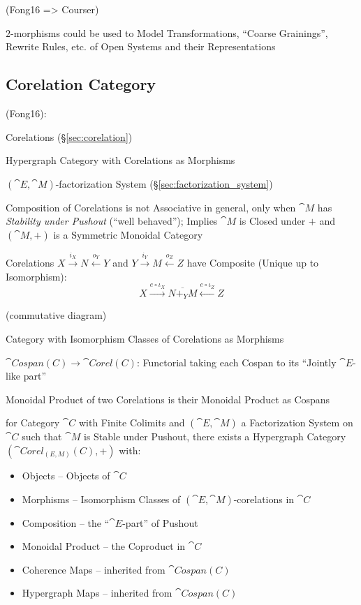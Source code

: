 (Fong16 => Courser)

$2$-morphisms could be used to Model Transformations, ``Coarse
Grainings'', Rewrite Rules, etc. of Open Systems and their
Representations



\subsection{Corelation Category}\label{sec:corelation_category}

(Fong16):

Corelations (\S\ref{sec:corelation})

Hypergraph Category with Corelations as Morphisms

$(\cat{E},\cat{M})$-factorization System
(\S\ref{sec:factorization_system})

Composition of Corelations is not Associative in general, only when
$\cat{M}$ has \emph{Stability under Pushout} (``well behaved'');
Implies $\cat{M}$ is Closed under $+$ and $(\cat{M},+)$ is a Symmetric
Monoidal Category

Corelations $X \xrightarrow{i_X} N \xleftarrow{o_Y} Y$ and $Y
\xrightarrow{i_Y} M \xleftarrow{o_Z} Z$ have Composite (Unique up to
Isomorphism):
\[
  X \xrightarrow{e\circ\iota_X} \overline{N +_Y M}
    \xleftarrow{e\circ\iota_Z} Z
\]

(commutative diagram) %

Category with Isomorphism Classes of Corelations as Morphisms

$\cat{Cospan(C)} \rightarrow \cat{Corel(C)}$: Functorial taking each
Cospan to its ``Jointly $\cat{E}$-like part''

Monoidal Product of two Corelations is their Monoidal Product as
Cospans

for Category $\cat{C}$ with Finite Colimits and $(\cat{E},\cat{M})$ a
Factorization System on $\cat{C}$ such that $\cat{M}$ is Stable under
Pushout, there exists a Hypergraph Category $(\cat{Corel_{(E,M)}(C)},
+)$ with:
\begin{itemize}
  \item Objects -- Objects of $\cat{C}$
  \item Morphisms -- Isomorphism Classes of
    $(\cat{E},\cat{M})$-corelations in $\cat{C}$
  \item Composition -- the ``$\cat{E}$-part'' of Pushout %
  \item Monoidal Product -- the Coproduct in $\cat{C}$
  \item Coherence Maps -- inherited from $\cat{Cospan(C)}$
  \item Hypergraph Maps -- inherited from $\cat{Cospan(C)}$
\end{itemize}


